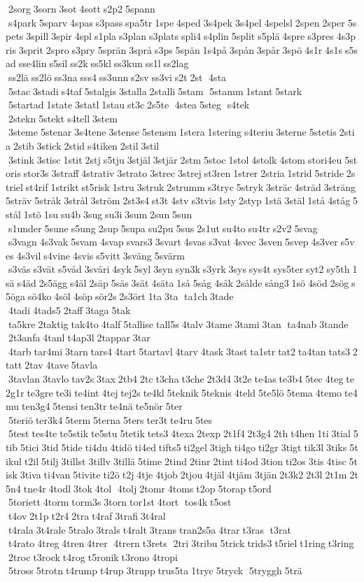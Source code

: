  2sorg 3sorn 3sot 4sott s2p2 5spann  s4park 5sparv 4spas s3pass spa5tr 1spe 4sped 3s4pek 3s4pel 4spelsl 2spen 2sper 5spets 3spill 3spir 4spl s1pla s3plan s3plats spli4 s4plin 5split s5plä 4spre s3pres 4s3pris 3sprit 2spro s3pry 5sprän 3språ s3ps 5spän 1s4på 3spån 3spår 3spö 4s1r 4s1s s5sad sse4lin s5sil ss2k ss5kl ss3kun ss1l ss2lag  ss2lä ss2lö ss3na sss4 ss3unn s2sv ss3vi s2t 2st  4sta  5stac 3stadi s4taf 5stalgis 3stalla 2stalli 5stam  5stamm 1stant 5stark  5startad 1state 3statl 1stau st3c 2s5te  4stea 5steg  s4tek  2stekn 5stekt s4tell 3stem  3steme 5stenar 3s4tene 3stense 5stensm 1stera 1stering s4teriu 3sterne 5stetis 2stia 2stib 3stick 2stid s4tiken 2stil 3stil  3stink 3stisc 1stit 2stj s5tju 3stjäl 3stjär 2stm 5stoc 1stol 4stolk 4stom stori4eu 5storis stor3s 3straff 4strativ 3strato 3strec 3strej st3ren 1strer 2stria 1strid 5stride 2striel st4rif 1strikt st5risk 1stru 3struk 2strumm s3tryc 5stryk 3sträc 4sträd 3sträng 5sträv 5stråk 3strål 3ström 2st3s4 st3t 4stv s3tvis 1sty 2styp 1stä 3stäl 1stå 4ståg 5stål 1stö 1su su4b 3sug su3i 3sum 2sun 5sun  s1under 5sune s5ung 2sup 5supa su2pu 5sus 2s1ut su4to su4tr s2v2 5svag  s3vagn 4s3vak 5svam 4svap svars3 3svart 4svas s3vat 4svec 3sven 5svep 4s3ver s5ves 4s3vil s4vine 4svis s5vitt 3sväng 5svärm  s3väs s3vät s5våd 3svåri 4syk 5syl 3syn syn3k s3yrk 3sys sys4t sys5ter syt2 sy5th 1sä s4äd 2s5ägg s4äl 2säp 5säs 3sät 4säta 1så 5såg 4såk 2sålde sång3 1sö 4söd 2sög s5öga sö4ko 4söl 4söp sör2s 2s3ört 1ta 3ta  ta1ch 3tade  4tadi 4tads5 2taff 3taga 5tak  ta5kre 2taktig tak4to 4talf 5tallise tall5s 4talv 3tame 3tami 3tan  ta4nab 3tande  2t3anfa 4tanl t4ap3l 2tappar 3tar  4tarb tar4mi 3tarn tars4 4tart 5tartavl 4tarv 4task 3tast ta1str tat2 ta4tan tats3 2tatt 2tav 4tave 5tavla  3tavlan 3tavlo tav2s 3tax 2tb4 2tc t3cha t3che 2t3d4 3t2e te4as te3b4 5tec 4teg te2g1r te3gre te3i te4int 4tej tej2s te4kl 5teknik 5teknis 4teld 5te5lö 5tema 4temo te4mu ten3g4 5tensi ten3tr te4nä te5nör 5ter  5teriö ter3k4 5term 5terna 5ters ter3t te4ru 5tes  5test tes4te te5stik te5stu 5tetik tets3 4texa 2texp 2t1f4 2t3g4 2th t4hen 1ti 3tial 5tib 5tici 3tid 5tide ti4du 4tidö ti4ed tifts5 ti2gel 3tigh ti4go ti2gr 3tigt tik3l 3tiks 5tikul t2il 5tilj 3tillst 3tillv 3tillä 5time 2tind 2tinr 2tint ti4od 3tion ti2os 3tis 4tisc 5tisk 3tiva ti4van 5tivite ti2ö t2j 4tje 4tjob 2tjou 4tjäl 4tjäm 3tjän 2t3k2 2t3l 2t1m 2t5n4 tne4r 4todl 3tok 4tol  4tolj 2tomr 4toms t2op 5torap t5ord  5toriett 4torm torm3s 3torn tor1st 4tort  tos4k t5ost  t4ov 2t1p t2r4 2tra t4raf 3trafi 3t4ral  t4rala 3t4rale 5tralo 3trals t4ralt 3trans tran2s5a 4trar t3ras  t3rat  t4rato 4treg 4tren 4trer  4trern t3rets  2tri 3tribu 5trick trids3 t5riel t1ring t3ring  2troc t3rock t4rog t5ronik t3rono 4tropi  5tross 5trotn t4rump t4rup 3trupp trus5ta 1tryc 5tryck  5tryggh 5trä 